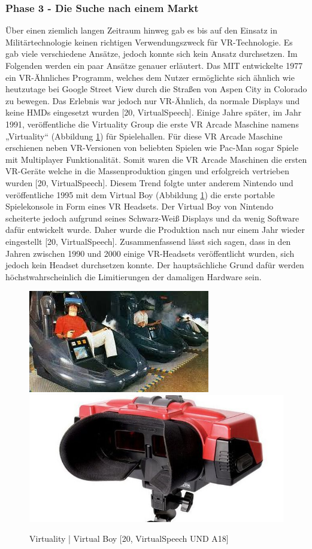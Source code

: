 \subsubsection{Phase 3 - Die Suche nach einem Markt}
Über einen ziemlich langen Zeitraum hinweg gab es bis auf den Einsatz in Militärtechnologie keinen richtigen Verwendungszweck für VR-Technologie. Es gab viele verschiedene Ansätze, jedoch konnte sich kein Ansatz durchsetzen. Im Folgenden werden ein paar Ansätze genauer erläutert.
\newline
Das MIT entwickelte 1977 ein VR-Ähnliches Programm, welches dem Nutzer ermöglichte sich ähnlich wie heutzutage bei Google Street View durch die Straßen von Aspen City in Colorado zu bewegen. Das Erlebnis war jedoch nur VR-Ähnlich, da normale Displays und keine HMDs eingesetzt wurden [20, VirtualSpeech].
\newline
Einige Jahre später, im Jahr 1991, veröffentliche die Virtuality Group die erste VR Arcade Maschine namens „Virtuality“ (Abbildung \ref{fig:VirtualityVRBoy}) für Spielehallen. Für diese VR Arcade Maschine erschienen neben VR-Versionen von beliebten Spielen wie Pac-Man sogar Spiele mit Multiplayer Funktionalität. Somit waren die VR Arcade Maschinen die ersten VR-Geräte welche in die Massenproduktion gingen und erfolgreich vertrieben wurden [20, VirtualSpeech]. Diesem Trend folgte unter anderem Nintendo und veröffentliche 1995 mit dem Virtual Boy (Abbildung \ref{fig:VirtualityVRBoy}) die erste portable Spielekonsole in Form eines VR Headsets. Der Virtual Boy von Nintendo scheiterte jedoch aufgrund seines Schwarz-Weiß Displays und da wenig Software dafür entwickelt wurde. Daher wurde die Produktion nach nur einem Jahr wieder eingestellt [20, VirtualSpeech].
\newline
Zusammenfassend lässt sich sagen, dass in den Jahren zwischen 1990 und 2000 einige VR-Headsets veröffentlicht wurden, sich jedoch kein Headset durchsetzen konnte. Der hauptsächliche Grund dafür werden höchstwahrscheinlich die Limitierungen der damaligen Hardware sein.
\begin{figure}[h]
	\centering
	\includegraphics[width=0.4\linewidth]{Bilder/A17_Virtuality}
	\includegraphics[width=0.4\linewidth]{Bilder/A18_VIrtualBoy}
	\caption{Virtuality | Virtual Boy [20, VirtualSpeech UND A18]}
	\label{fig:VirtualityVRBoy}
\end{figure}

